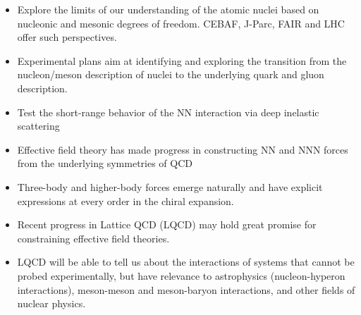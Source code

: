     \begin{itemize}
\item  Explore the limits of our understanding of the atomic nuclei based
on nucleonic and mesonic degrees of freedom.  CEBAF, J-Parc, FAIR and LHC offer such perspectives.
\item Experimental plans aim at identifying and exploring the transition
from the nucleon/meson description of nuclei to the underlying quark and 
gluon description.
\item Test the short-range behavior of the NN interaction via deep inelastic scattering
\item Effective field theory has made progress in constructing NN and NNN
forces from the underlying symmetries of QCD 
\item Three-body and higher-body forces emerge naturally and have explicit expressions at 
every order in the chiral expansion. 
\item Recent progress in Lattice QCD (LQCD) may hold great promise for constraining
effective field theories.
\item LQCD will be able to tell us about the interactions of systems 
that cannot be probed experimentally, but have relevance to astrophysics (nucleon-hyperon interactions), meson-meson and meson-baryon interactions, and other fields of nuclear physics. 
    \end{itemize}


